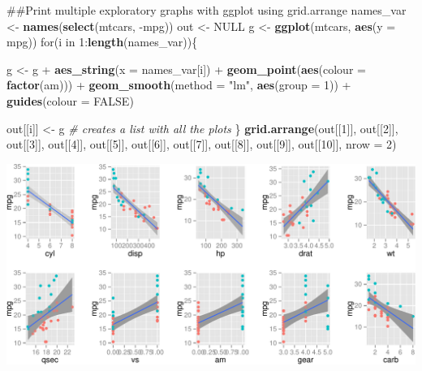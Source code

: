 \documentclass[]{article}
\newenvironment{Shaded}{\begin{snugshade}}{\end{snugshade}}
\newcommand{\KeywordTok}[1]{\textcolor[rgb]{0.13,0.29,0.53}{\textbf{{#1}}}}
\newcommand{\DataTypeTok}[1]{\textcolor[rgb]{0.13,0.29,0.53}{{#1}}}
\newcommand{\DecValTok}[1]{\textcolor[rgb]{0.00,0.00,0.81}{{#1}}}
\newcommand{\StringTok}[1]{\textcolor[rgb]{0.31,0.60,0.02}{{#1}}}
\newcommand{\CommentTok}[1]{\textcolor[rgb]{0.56,0.35,0.01}{\textit{{#1}}}}
\newcommand{\OtherTok}[1]{\textcolor[rgb]{0.56,0.35,0.01}{{#1}}}
\newcommand{\NormalTok}[1]{{#1}}
\begin{document}
\begin{Shaded}
\begin{Highlighting}[]
\NormalTok{##Print multiple exploratory graphs with ggplot using grid.arrange}
\NormalTok{names_var <-}\StringTok{ }\KeywordTok{names}\NormalTok{(}\KeywordTok{select}\NormalTok{(mtcars, -mpg))}
\NormalTok{out <-}\StringTok{ }\OtherTok{NULL}
\NormalTok{g <-}\StringTok{ }\KeywordTok{ggplot}\NormalTok{(mtcars, }\KeywordTok{aes}\NormalTok{(}\DataTypeTok{y =} \NormalTok{mpg))}
\NormalTok{for(i in }\DecValTok{1}\NormalTok{:}\KeywordTok{length}\NormalTok{(names_var))\{}
    
    \NormalTok{g <-}\StringTok{ }\NormalTok{g +}\StringTok{ }\KeywordTok{aes_string}\NormalTok{(}\DataTypeTok{x =} \NormalTok{names_var[i]) +}\StringTok{ }
\StringTok{        }\KeywordTok{geom_point}\NormalTok{(}\KeywordTok{aes}\NormalTok{(}\DataTypeTok{colour =} \KeywordTok{factor}\NormalTok{(am))) +}\StringTok{ }
\StringTok{        }\KeywordTok{geom_smooth}\NormalTok{(}\DataTypeTok{method =} \StringTok{"lm"}\NormalTok{, }\KeywordTok{aes}\NormalTok{(}\DataTypeTok{group =} \DecValTok{1}\NormalTok{)) +}\StringTok{ }
\StringTok{        }\KeywordTok{guides}\NormalTok{(}\DataTypeTok{colour =} \OtherTok{FALSE}\NormalTok{)}
    
    \NormalTok{out[[i]] <-}\StringTok{ }\NormalTok{g }\CommentTok{# creates a list with all the plots }
\NormalTok{\}}
\KeywordTok{grid.arrange}\NormalTok{(out[[}\DecValTok{1}\NormalTok{]], out[[}\DecValTok{2}\NormalTok{]], out[[}\DecValTok{3}\NormalTok{]], out[[}\DecValTok{4}\NormalTok{]], }
             \NormalTok{out[[}\DecValTok{5}\NormalTok{]], out[[}\DecValTok{6}\NormalTok{]], out[[}\DecValTok{7}\NormalTok{]], out[[}\DecValTok{8}\NormalTok{]], }
             \NormalTok{out[[}\DecValTok{9}\NormalTok{]], out[[}\DecValTok{10}\NormalTok{]], }\DataTypeTok{nrow =} \DecValTok{2}\NormalTok{)}
\end{Highlighting}
\end{Shaded}

\includegraphics{coursera_regression_project_files/figure-latex/unnamed-chunk-1-1.pdf}
\end{document}
